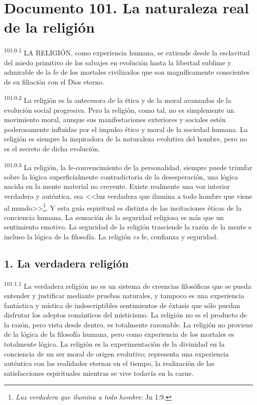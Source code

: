 \chapter{Documento 101. La naturaleza real de la religión}
\par
\textsuperscript{101:0.1} LA RELIGIÓN, como experiencia humana, se extiende desde la esclavitud del miedo primitivo de los salvajes en evolución hasta la libertad sublime y admirable de la fe de los mortales civilizados que son magníficamente conscientes de su filiación con el Dios eterno.

\par
\textsuperscript{101:0.2} La religión es la antecesora de la ética y de la moral avanzadas de la evolución social progresiva. Pero la religión, como tal, no es simplemente un movimiento moral, aunque sus manifestaciones exteriores y sociales estén poderosamente influidas por el impulso ético y moral de la sociedad humana. La religión es siempre la inspiradora de la naturaleza evolutiva del hombre, pero no es el secreto de dicha evolución.

\par
\textsuperscript{101:0.3} La religión, la fe-convencimiento de la personalidad, siempre puede triunfar sobre la lógica superficialmente contradictoria de la desesperación, una lógica nacida en la mente material no creyente. Existe realmente una voz interior verdadera y auténtica, esa <<luz verdadera que ilumina a todo hombre que viene al mundo>>\footnote{\textit{Luz verdadera que ilumina a todo hombre}: Jn 1:9.}. Y esta guía espiritual es distinta de las incitaciones éticas de la conciencia humana. La sensación de la seguridad religiosa es más que un sentimiento emotivo. La seguridad de la religión trasciende la razón de la mente e incluso la lógica de la filosofía. La religión \textit{es} fe, confianza y seguridad.

\section*{1. La verdadera religión}
\par
\textsuperscript{101:1.1} La verdadera religión no es un sistema de creencias filosóficas que se pueda entender y justificar mediante pruebas naturales, y tampoco es una experiencia fantástica y mística de indescriptibles sentimientos de éxtasis que sólo puedan disfrutar los adeptos románticos del misticismo. La religión no es el producto de la razón, pero vista desde dentro, es totalmente razonable. La religión no proviene de la lógica de la filosofía humana, pero como experiencia de los mortales es totalmente lógica. La religión es la experimentación de la divinidad en la conciencia de un ser moral de origen evolutivo; representa una experiencia auténtica con las realidades eternas en el tiempo, la realización de las satisfacciones espirituales mientras se vive todavía en la carne.

